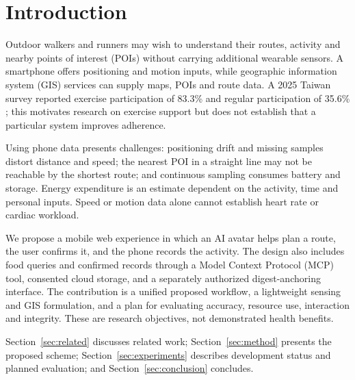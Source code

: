 \section{Introduction}\label{sec:intro}
Outdoor walkers and runners may wish to understand their routes, activity and nearby points of interest (POIs) without carrying additional wearable sensors. A smartphone offers positioning and motion inputs, while geographic information system (GIS) services can supply maps, POIs and route data. A 2025 Taiwan survey reported exercise participation of 83.3\% and regular participation of 35.6\% \cite{survey}; this motivates research on exercise support but does not establish that a particular system improves adherence.

Using phone data presents challenges: positioning drift and missing samples distort distance and speed; the nearest POI in a straight line may not be reachable by the shortest route; and continuous sampling consumes battery and storage. Energy expenditure is an estimate dependent on the activity, time and personal inputs. Speed or motion data alone cannot establish heart rate or cardiac workload.

We propose a mobile web experience in which an AI avatar helps plan a route, the user confirms it, and the phone records the activity. The design also includes food queries and confirmed records through a Model Context Protocol (MCP) tool, consented cloud storage, and a separately authorized digest-anchoring interface. The contribution is a unified proposed workflow, a lightweight sensing and GIS formulation, and a plan for evaluating accuracy, resource use, interaction and integrity. These are research objectives, not demonstrated health benefits.

Section~\ref{sec:related} discusses related work; Section~\ref{sec:method} presents the proposed scheme; Section~\ref{sec:experiments} describes development status and planned evaluation; and Section~\ref{sec:conclusion} concludes.
